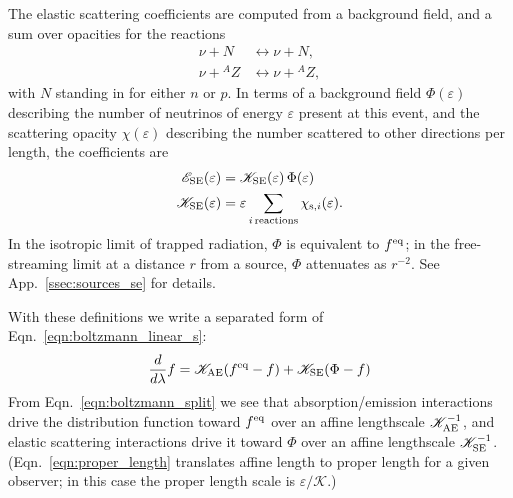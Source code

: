 \documentclass[aps,floatfix,prd,superscriptaddress,twocolumn]{revtex4-1}
\begin{document}
The elastic scattering coefficients are computed from
a background field, and a sum over opacities for
the reactions
\begin{align}
  \nu + N     &\leftrightarrow \nu + N,\nonumber\\
  \nu + {}^AZ &\leftrightarrow \nu + {}^AZ,\nonumber
\end{align}
with $N$ standing in for either $n$ or $p$.
In terms of a background field $\Phi(\varepsilon)$ describing
the number of neutrinos of energy $\varepsilon$ present at this event,
and the scattering opacity $\chi(\varepsilon)$ describing the
number scattered to other directions per length,
the coefficients are
\begin{align}
  \label{eqn:se_emissivity}
  \mathscr{E}_{\rm SE}(\varepsilon)
  &= \mathscr{K}_{\rm SE}(\varepsilon) \, \Phi(\varepsilon) \, \\
  \label{eqn:se_opacity_summed}
  \mathscr{K}_{\rm SE}(\varepsilon)
  &= \varepsilon \sum_{i\,{\rm reactions}} \chi_{{\rm s},i}(\varepsilon).
\end{align}
In the isotropic limit of trapped radiation,
$\Phi$ is equivalent to $f^{\rm eq}$;
in the free-streaming limit at a distance $r$ from a source,
$\Phi$ attenuates as $r^{-2}$.
See App.~\ref{ssec:sources_se} for details.

With these definitions we write a separated form of
Eqn.~\ref{eqn:boltzmann_linear_s}:
\begin{equation}
  \label{eqn:boltzmann_split}
  \frac{d}{d\lambda}f =
  \mathscr{K}_{\rm AE}(f^{\rm eq}-f)
  + \mathscr{K}_{\rm SE}(\Phi-f)
\end{equation}
From Eqn.~\ref{eqn:boltzmann_split} we see that
absorption/emission interactions drive the distribution function
toward $f^{\rm eq}$ over an affine lengthscale $\mathscr{K}_{\rm AE}^{-1}$,
and elastic scattering interactions drive it
toward $\Phi$ over an affine lengthscale $\mathscr{K}_{\rm SE}^{-1}$.
(Eqn.~\ref{eqn:proper_length} translates affine length to proper length
for a given observer; in this case the proper length scale is
$\varepsilon/\mathscr{K}$.)

\end{document}
